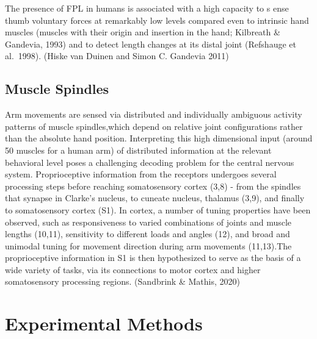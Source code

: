{            The presence of FPL in humans is associated with a high
            capacity to s ense thumb voluntary forces at remarkably low
            levels compared even to intrinsic hand muscles (muscles with
            their origin and insertion in the hand; Kilbreath \&
            Gandevia, 1993) and to detect length changes at its distal
            joint (Refshauge et al.~1998). (Hiske van Duinen and Simon
            C. Gandevia 2011)

            \hypertarget{muscle-spindles}{%
            \subsection{Muscle Spindles}\label{muscle-spindles}}

            Arm movements are sensed via distributed and individually
            ambiguous activity patterns of muscle spindles,which depend
            on relative joint configurations rather than the absolute
            hand position. Interpreting this high dimensional input
            (around 50 muscles for a human arm) of distributed
            information at the relevant behavioral level poses a
            challenging decoding problem for the central nervous system.
            Proprioceptive information from the receptors undergoes
            several processing steps before reaching somatosensory
            cortex (3,8) - from the spindles that synapse in Clarke's
            nucleus, to cuneate nucleus, thalamus (3,9), and finally to
            somatosensory cortex (S1). In cortex, a number of tuning
            properties have been observed, such as responsiveness to
            varied combinations of joints and muscle lengths (10,11),
            sensitivity to different loads and angles (12), and broad
            and unimodal tuning for movement direction during arm
            movements (11,13).The proprioceptive information in S1 is
            then hypothesized to serve as the basis of a wide variety of
            tasks, via its connections to motor cortex and higher
            somatosensory processing regions. (Sandbrink \& Mathis,
            2020)

            \hypertarget{experimental-methods}{%
            \section{Experimental Methods}\label{experimental-methods}}

            \hypertarget{prior-work}{%
}}
